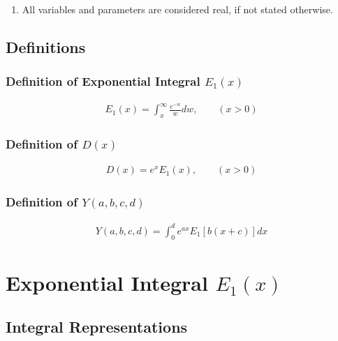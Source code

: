 \documentclass[bibliography=totocnumbered]{scrartcl}
\newcommand{\assume}[1][\text{MISSING PARAMETER}]{,\qquad\left(#1\right)}
\begin{document}
	\begin{enumerate}
		\item All variables and parameters are considered real, if not stated otherwise.
	\end{enumerate}
	
	\subsection{Definitions}
	
	\subsubsection[Definition of Exponential Integral E1(x)]{Definition of Exponential Integral $E_1\left(x\right)$}
	
	\begin{gather}
		E_1\left(x\right)=\int_{x}^{\infty}\frac{e^{-w}}{w}dw\assume[x>0]\label{eq: E1}
	\end{gather}
	
	\subsubsection[Definition of D(x)]{Definition of $D\left(x\right)$}
	\label{subsubsec: D}
	
	\begin{gather}
		D\left(x\right)=e^xE_1\left(x\right)\assume[x>0]\label{eq: D}
	\end{gather}
	
	\subsubsection[Definition of Y(a,b,c,d)]{Definition of $Y\left(a, b, c, d\right)$}
	
	\begin{gather}
		Y\left(a, b, c, d\right)=\int_{0}^{d}e^{ax}E_1\left[b\left(x+c\right)\right]dx\label{eq: Y}
	\end{gather}
	
	\clearpage
	
	\section[Exponential Integral E1(x)]{Exponential Integral $E_1\left(x\right)$}
	
	\subsection{Integral Representations}
	
\end{document}
